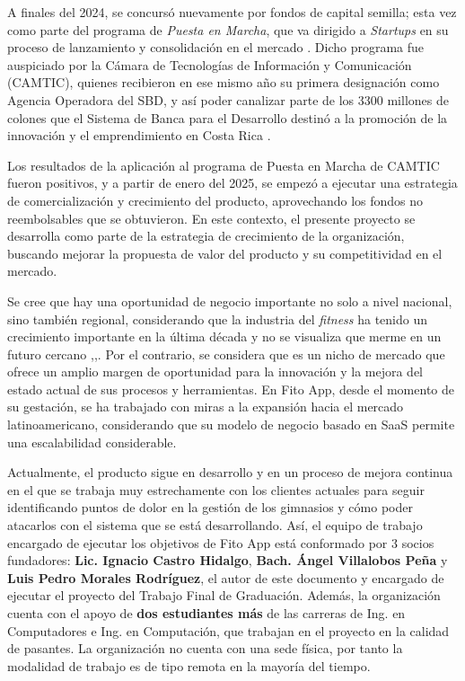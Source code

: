 A finales del 2024, se concursó nuevamente por fondos de capital semilla; esta vez como parte del programa de \textit{Puesta en Marcha}, que va dirigido a \textit{Startups} en su proceso de lanzamiento y consolidación en el mercado \cite{sbd_fondos}. Dicho programa fue auspiciado por la Cámara de Tecnologías de Información y Comunicación (CAMTIC), quienes recibieron en ese mismo año su primera designación como Agencia Operadora del SBD, y así poder canalizar parte de los \textcolonmonetary{}3300 millones de colones que el Sistema de Banca para el Desarrollo destinó a la promoción de la innovación y el emprendimiento en Costa Rica \cite{sbd_fondos}.

Los resultados de la aplicación al programa de Puesta en Marcha de CAMTIC fueron positivos, y a partir de enero del 2025, se empezó a ejecutar una estrategia de comercialización y crecimiento del producto, aprovechando los fondos no reembolsables que se obtuvieron. En este contexto, el presente proyecto se desarrolla como parte de la estrategia de crecimiento de la organización, buscando mejorar la propuesta de valor del producto y su competitividad en el mercado.

Se cree que hay una oportunidad de negocio importante no solo a nivel nacional, sino también regional, considerando que la industria del \textit{fitness} ha tenido un crecimiento importante en la última década y no se visualiza que merme en un futuro cercano \cite{cmdsport2024fitness},\cite{mercadofitness},\cite{mordor}. Por el contrario, se considera que es un nicho de mercado que ofrece un amplio margen de oportunidad para la innovación y la mejora del estado actual de sus procesos y herramientas. En Fito App, desde el momento de su gestación, se ha trabajado con miras a la expansión hacia el mercado latinoamericano, considerando que su modelo de negocio basado en SaaS permite una escalabilidad considerable. 

Actualmente, el producto sigue en desarrollo y en un proceso de mejora continua en el que se trabaja muy estrechamente con los clientes actuales para seguir identificando puntos de dolor en la gestión de los gimnasios y cómo poder atacarlos con el sistema que se está desarrollando. Así, el equipo de trabajo encargado de ejecutar los objetivos de Fito App está conformado por 3 socios fundadores: \textbf{Lic. Ignacio Castro Hidalgo}, \textbf{Bach. Ángel Villalobos Peña} y \textbf{Luis Pedro Morales Rodríguez}, el autor de este documento y encargado de ejecutar el proyecto del Trabajo Final de Graduación. Además, la organización cuenta con el apoyo de \textbf{dos estudiantes más} de las carreras de Ing. en Computadores e Ing. en Computación, que trabajan en el proyecto en la calidad de pasantes. La organización no cuenta con una sede física, por tanto la modalidad de trabajo es de tipo remota en la mayoría del tiempo.

